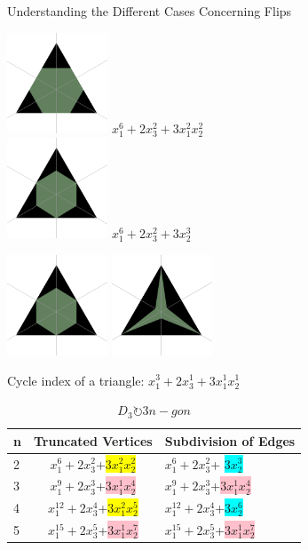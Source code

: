 \documentclass{beamer}
\begin{document}
\begin{frame}{Understanding the Different Cases Concerning Flips}

\includegraphics[width=3cm]{img/claire/newtriangle_copya}
$x_1^6+2x_3^2+3x_1^2x_2^2$\\
\includegraphics[width=3cm]{img/claire/newtriangle_copy1}
$x_1^6+2x_3^2+ 3x_2^3$\\
\end{frame}

\begin{frame}
\includegraphics[width=3cm]{img/claire/newtriangle_copy1}
\mapsto
\includegraphics[width=3cm]{img/claire/newtriangle_copyb}
\end{frame}

\begin{frame}
Cycle index of a triangle:
$x_1^3+2x_3^1+3x_1^1 x_2^1$\\

\begin{table}
\centering
\begin{tabular}{l|c|l}
n & Truncated Vertices & Subdivision of Edges\\ \hline
2 & $x_1^6+2x_3^2$+\colorbox{yellow}{$3x_1^2x_2^2$} & $x_1^6+2x_3^2$+ \colorbox{cyan}{$3x_2^3$}\\
3 & $x_1^9+2x_3^3$+\colorbox{pink}{$3x_1^1x_2^4$}  &  $x_1^9+2x_3^3$+\colorbox{pink}{$3x_1^1x_2^4$}\\
4 & $x_1^12+2x_3^4$+\colorbox{yellow}{$3x_1^2x_2^5$} & $x_1^12+2x_3^4$+\colorbox{cyan}{$3x_2^6$}\\
5& $x_1^15+2x_3^5$+\colorbox{pink}{$3x_1^1x_2^7$} & $x_1^15+2x_3^5$+\colorbox{pink}{$3x_1^1x_2^7$}\\
\end{tabular}
\caption{$D_3 \circlearrowright 3n-gon$}
\end{table}
\end{frame}
\end{document}
